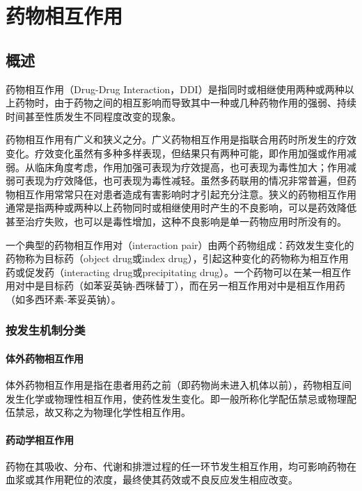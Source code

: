 \chapter{药物相互作用}

\section{概述}

药物相互作用（Drug-Drug
Interaction，DDI）是指同时或相继使用两种或两种以上药物时，由于药物之间的相互影响而导致其中一种或几种药物作用的强弱、持续时间甚至性质发生不同程度改变的现象。

药物相互作用有广义和狭义之分。广义药物相互作用是指联合用药时所发生的疗效变化。疗效变化虽然有多种多样表现，但结果只有两种可能，即作用加强或作用减弱。从临床角度考虑，作用加强可表现为疗效提高，也可表现为毒性加大；作用减弱可表现为疗效降低，也可表现为毒性减轻。虽然多药联用的情况非常普遍，但药物相互作用常常只在对患者造成有害影响时才引起充分注意。狭义的药物相互作用通常是指两种或两种以上药物同时或相继使用时产生的不良影响，可以是药效降低甚至治疗失败，也可以是毒性增加，这种不良影响是单一药物应用时所没有的。

一个典型的药物相互作用对（interaction
pair）由两个药物组成：药效发生变化的药物称为目标药（object drug或index
drug），引起这种变化的药物称为相互作用药或促发药（interacting
drug或precipitating
drug）。一个药物可以在某一相互作用对中是目标药（如苯妥英钠-西咪替丁），而在另一相互作用对中是相互作用药（如多西环素-苯妥英钠）。

\subsection{按发生机制分类}

\subsubsection{体外药物相互作用}

体外药物相互作用是指在患者用药之前（即药物尚未进入机体以前），药物相互间发生化学或物理性相互作用，使药性发生变化。即一般所称化学配伍禁忌或物理配伍禁忌，故又称之为物理化学性相互作用。

\subsubsection{药动学相互作用}

药物在其吸收、分布、代谢和排泄过程的任一环节发生相互作用，均可影响药物在血浆或其作用靶位的浓度，最终使其药效或不良反应发生相应改变。

